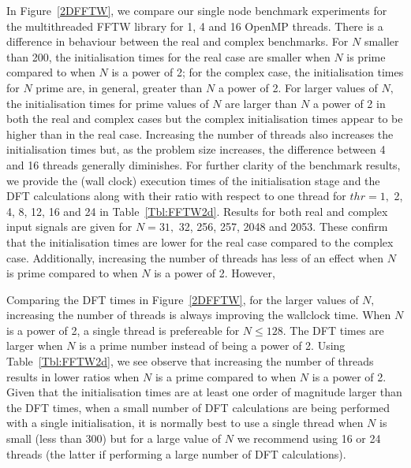 \documentclass[a4paper]{article}
\begin{document}
In Figure~\ref{2DFFTW}, we compare our single node benchmark
experiments for the multithreaded FFTW library for 1, 4 and 16 OpenMP
threads. There is a difference in behaviour between the real and
complex benchmarks. For $N$ smaller than 200, the initialisation times
for the real case are smaller when $N$ is prime compared to when $N$
is a power of 2; for the complex case, the initialisation times for
$N$ prime are, in general, greater than $N$ a power of 2. For larger
values of $N,$ the initialisation times for prime values of $N$ are
larger than $N$ a power of 2 in both the real and complex cases but
the complex initialisation times appear to be higher than in the real
case. Increasing the number of threads also increases the
initialisation times but, as the problem size increases, the
difference between 4 and 16 threads generally diminishes. For further
clarity of the benchmark results, we provide the (wall clock)
execution times of the initialisation stage and the DFT calculations
along with their ratio with respect to one thread for $thr=1,$ 2, 4,
8, 12, 16 and 24 in Table~\ref{Tbl:FFTW2d}. Results for both real and
complex input signals are given for $N=31,$ 32, 256, 257, 2048 and
2053. These confirm that the initialisation times are lower for the
real case compared to the complex case. Additionally, increasing the
number of threads has less of an effect when $N$ is prime compared to
when $N$ is a power of 2. However,

Comparing the DFT times in Figure~\ref{2DFFTW}, for the larger values
of $N,$ increasing the number of threads is always improving the
wallclock time. When $N$ is a power of 2, a single thread is
prefereable for $N\le 128.$ The DFT times are larger when $N$ is a
prime number instead of being a power of 2. Using
Table~\ref{Tbl:FFTW2d}, we see observe that increasing the number of
threads results in lower ratios when $N$ is a prime compared to when
$N$ is a power of 2. Given that the initialisation times are at least
one order of magnitude larger than the DFT times, when a small number
of DFT calculations are being performed with a single initialisation,
it is normally best to use a single thread when $N$ is small (less
than 300) but for a large value of $N$ we recommend using 16 or 24
threads (the latter if performing a large number of DFT calculations).
\end{document}
